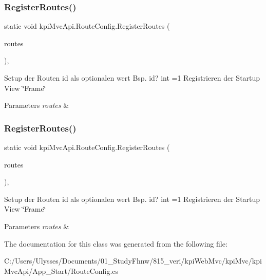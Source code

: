 \subsubsection{\texorpdfstring{Register\+Routes()}{RegisterRoutes()}\hspace{0.1cm}{\footnotesize\ttfamily [1/2]}}
{\footnotesize\ttfamily static void kpi\+Mvc\+Api.\+Route\+Config.\+Register\+Routes (\begin{DoxyParamCaption}\item[{Route\+Collection}]{routes }\end{DoxyParamCaption})\hspace{0.3cm}{\ttfamily [inline]}, {\ttfamily [static]}}



Setup der Routen id als optionalen wert Bsp. id? int =1 Registrieren der Startup View \char`\"{}\+Frame\char`\"{} 


\begin{DoxyParams}{Parameters}
{\em routes} & \\
\hline
\end{DoxyParams}
\mbox{\label{classkpi_mvc_api_1_1_route_config_a7695727c1d42e9d813eb3c0c63802ec3}} 
\subsubsection{\texorpdfstring{Register\+Routes()}{RegisterRoutes()}\hspace{0.1cm}{\footnotesize\ttfamily [2/2]}}
{\footnotesize\ttfamily static void kpi\+Mvc\+Api.\+Route\+Config.\+Register\+Routes (\begin{DoxyParamCaption}\item[{Route\+Collection}]{routes }\end{DoxyParamCaption})\hspace{0.3cm}{\ttfamily [inline]}, {\ttfamily [static]}}



Setup der Routen id als optionalen wert Bsp. id? int =1 Registrieren der Startup View \char`\"{}\+Frame\char`\"{} 


\begin{DoxyParams}{Parameters}
{\em routes} & \\
\hline
\end{DoxyParams}


The documentation for this class was generated from the following file\+:\begin{DoxyCompactItemize}
\item 
C\+:/\+Users/\+Ulysses/\+Documents/01\+\_\+\+Study\+Fhnw/815\+\_\+veri/kpi\+Web\+Mvc/kpi\+Mvc/kpi\+Mvc\+Api/\+App\+\_\+\+Start/Route\+Config.\+cs\end{DoxyCompactItemize}
